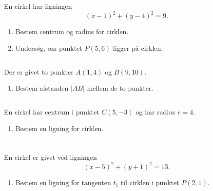 \documentclass[10pt,a4paper,table]{article}
\begin{document}
\thispagestyle{plain}

\section{}
\subsection{}
En cirkel har ligningen
\[
    (x-1)^2 + (y-4)^2 = 9 .
\]

\begin{enumerate}
    \item Bestem centrum og radius for cirklen.
    \item Undersøg, om punktet $P(5,6)$ ligger på cirklen.
\end{enumerate}

\subsection{}
Der er givet to punkter $A(1,4)$ og $B(9,10)$.

\begin{enumerate}
    \item Bestem afstanden $|AB|$ mellem de to punkter.
\end{enumerate}

\subsection{}
En cirkel har centrum i punktet $C(5,-3)$ og har radius $r=4$.

\begin{enumerate}
    \item Bestem en ligning for cirklen.
\end{enumerate}

\section{}
\subsection{}
En cirkel er givet ved ligningen
\[
    (x-5)^2 + (y+1)^2 = 13 .
\]

\begin{enumerate}
    \item Bestem en ligning for tangenten $t_1$ til cirklen i punktet $P(2,1)$.
\end{enumerate}
\end{document}
